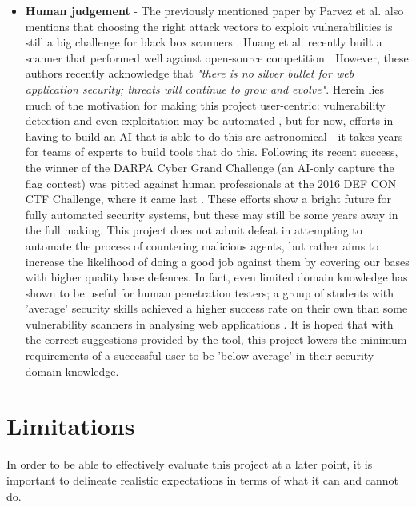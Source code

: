 \begin{itemize}
	
	\item \textbf{Human judgement} - The previously mentioned paper by Parvez et al. also mentions that choosing the right attack vectors to exploit vulnerabilities is still a big challenge for black box scanners \cite{analysisOfEffectivenessOfBlackBoxWebAppScannersStoredSQLStoredXSS}. Huang et al. recently built a scanner that performed well against open-source competition \cite{webAppSecThreatsCountermeasuresPitfalls}. However, these authors recently acknowledge that \emph{"there is no silver bullet for web application security; threats will continue to grow and evolve"}. Herein lies much of the motivation for making this project user-centric: vulnerability detection and even exploitation may be automated \cite{darpaAIChallenge}, but for now, efforts in having to build an AI that is able to do this are astronomical - it takes years for teams of experts to build tools that do this. Following its recent success, the winner of the DARPA Cyber Grand Challenge (an AI-only capture the flag contest) was pitted against human professionals at the 2016 DEF CON CTF Challenge, where it came last \cite{defcon16Results}. These efforts show a bright future for fully automated security systems, but these may still be some years away in the full making. This project does not admit defeat in attempting to automate the process of countering malicious agents, but rather aims to increase the likelihood of doing a good job against them by covering our bases with higher quality base defences. In fact, even limited domain knowledge has shown to be useful for human penetration testers; a group of students with 'average' security skills achieved a higher success rate on their own than some vulnerability scanners in analysing web applications \cite{whyJohnnyCantPentest}. It is hoped that with the correct suggestions provided by the tool, this project lowers the minimum requirements of a successful user to be 'below average' in their security domain knowledge. \\

\end{itemize}


 
\section{Limitations}
\label{limitations}

In order to be able to effectively evaluate this project at a later point, it is important to delineate realistic expectations in terms of what it can and cannot do. 

